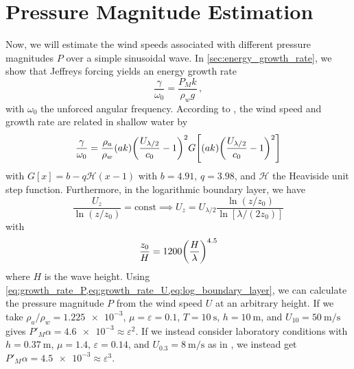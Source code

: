 \documentclass{jfm}
\renewcommand*{\epsilon}{\varepsilon}
\begin{document}
\section{Pressure Magnitude Estimation}
Now, we will estimate the wind speeds associated with different pressure
magnitudes $P$ over a simple sinusoidal wave.
In \cref{sec:energy_growth_rate}, we show that Jeffreys forcing yields
an energy growth rate
\begin{equation}
  \frac{\gamma}{\omega_0} = \frac{P_M k}{\rho_w g} \,,
  \label{eq:growth_rate_P}
\end{equation}
with $\omega_0$ the unforced angular frequency.
According to \citet{donelan2006wave}, the wind speed and growth rate
are related in shallow water by
\begin{equation}
  \frac{\gamma}{\omega_0} = \frac{\rho_a}{\rho_w} (ak)
  \pqty{\frac{U_{\lambda/2}}{c_0} - 1}^2
  G \bqty{(ak)
  \pqty{\frac{U_{\lambda/2}}{c_0} - 1}^2}
  \label{eq:growth_rate_U}
\end{equation}
with $G[x] = b - q \mathcal{H}(x - 1)$ with $b = 4.91$, $q = 3.98$, and
$\mathcal{H}$ the Heaviside unit step function.
Furthermore, in the logarithmic boundary layer, we have
\begin{equation}
  \frac{U_z}{\ln(z/z_0)} = \text{const}
  \implies U_{z} = U_{\lambda/2} \frac{\ln(z/z_0)}{\ln[\lambda/(2 z_0)]}
  \label{eq:log_boundary_layer}
\end{equation}
with \citep{taylor2001dependence}
\begin{equation}
  \frac{z_0}{H} = 1200 \pqty{\frac{H}{\lambda}}^{4.5}
\end{equation}
where $H$ is the wave height.
Using \cref{eq:growth_rate_P,eq:growth_rate_U,eq:log_boundary_layer}, we
can calculate the pressure magnitude $P$ from the wind speed $U$ at an
arbitrary height.
If we take $\rho_a/\rho_w = \num{1.225e-3}$, $\mu = \epsilon = 0.1$, $T
= \SI{10}{\second}$, $h = \SI{10}{\meter}$, and $U_{10} =
\SI{50}{\meter\per\second}$ gives $P'_M \alpha = \num{4.6e-3} \approx
\epsilon^2$.
If we instead consider laboratory conditions with $h=\SI{0.37}{\meter}$,
$\mu = 1.4$, $\epsilon = 0.14$, and $U_{0.3} = \SI{8}{\meter\per\second}$
as in \citet{feddersen2005wind}, we instead get $P'_M \alpha =
\num{4.5e-3} \approx \epsilon^3$.
\end{document}
